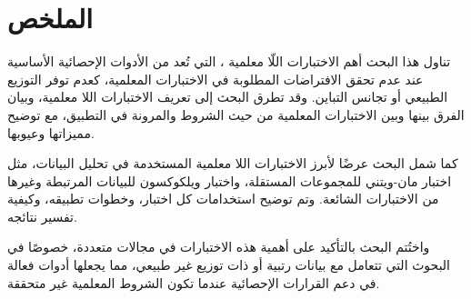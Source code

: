 \chapter*{الملخص}

تناول هذا البحث أهم الاختبارات اللّا معلمية 
، التي تُعد من الأدوات الإحصائية الأساسية عند عدم تحقق الافتراضات المطلوبة في الاختبارات المعلمية، كعدم توفر التوزيع الطبيعي أو تجانس التباين. وقد تطرق البحث إلى تعريف الاختبارات اللا معلمية، وبيان الفرق بينها وبين الاختبارات المعلمية من حيث الشروط والمرونة في التطبيق، مع توضيح مميزاتها وعيوبها.

كما شمل البحث عرضًا لأبرز الاختبارات اللا معلمية المستخدمة في تحليل البيانات، مثل اختبار مان-ويتني 
 للمجموعات المستقلة، واختبار ويلكوكسون  للبيانات المرتبطة وغيرها من الاختبارات الشائعة. وتم توضيح استخدامات كل اختبار، وخطوات تطبيقه، وكيفية تفسير نتائجه.

واختُتم البحث بالتأكيد على أهمية هذه الاختبارات في مجالات متعددة، خصوصًا في البحوث التي تتعامل مع بيانات رتبية أو ذات توزيع غير طبيعي، مما يجعلها أدوات فعالة في دعم القرارات الإحصائية عندما تكون الشروط المعلمية غير متحققة.